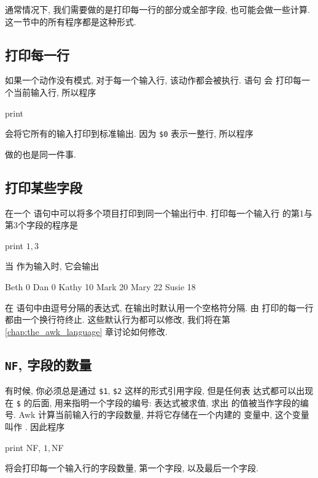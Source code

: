 通常情况下, 我们需要做的是打印每一行的部分或全部字段, 也可能会做一些计算.
这一节中的所有程序都是这种形式.

\subsection{打印每一行}
\label{subsec:printing_every_line}

如果一个动作没有模式, 对于每一个输入行, 该动作都会被执行. 语句 \print 会
打印每一个当前输入行, 所以程序
\begin{awkcode}
    { print }
\end{awkcode}
会将它所有的输入打印到标准输出. 因为 \verb'$0' 表示一整行, 所以程序
做的也是同一件事.

\subsection{打印某些字段}
\label{subsec:printing_certain_fields}

在一个 \print 语句中可以将多个项目打印到同一个输出行中. 打印每一个输入行
的第1与第3个字段的程序是
\begin{awkcode}
    { print $1, $3 }
\end{awkcode}
当  作为输入时, 它会输出
\begin{file}
    Beth 0
    Dan 0
    Kathy 10
    Mark 20
    Mary 22
    Susie 18
\end{file}
在 \print 语句中由逗号分隔的表达式, 在输出时默认用一个空格符分隔. 由
\print 打印的每一行都由一个换行符终止. 这些默认行为都可以修改, 我们将在第
\ref{chap:the_awk_language} 章讨论如何修改.

\subsection{\texttt{NF}, 字段的数量}
\label{subsec:nf_the_number_fields}

有时候, 你必须总是通过 \verb'$1', \verb'$2' 这样的形式引用字段, 但是任何表
达式都可以出现在 \verb'$' 的后面, 用来指明一个字段的编号: 表达式被求值, 求出
的值被当作字段的编号. Awk 计算当前输入行的字段数量, 并将它存储在一个内建的
变量中, 这个变量叫作 \nf. 因此程序
\begin{awkcode}
    { print NF, $1, $NF }
\end{awkcode}
将会打印每一个输入行的字段数量, 第一个字段, 以及最后一个字段.

